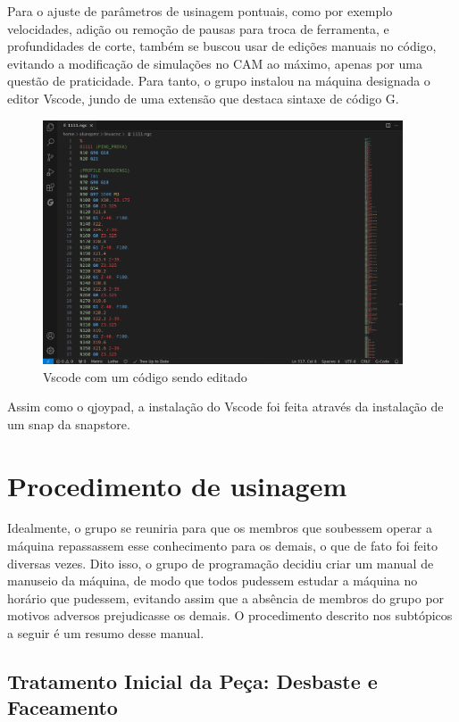 Para o ajuste de parâmetros de usinagem pontuais, como por exemplo velocidades, adição ou remoção de pausas para troca de ferramenta, e profundidades de corte, também se buscou usar de edições manuais no código, evitando a modificação de simulações no CAM ao máximo, apenas por uma questão de praticidade. Para tanto, o grupo instalou na máquina designada o editor Vscode, jundo de uma extensão que destaca sintaxe de código G.

\begin{figure}[H]
    \begin{center}
        \includegraphics[width=0.95\textwidth]{images/prog/codigo_g.png}
    \end{center}
    \caption{Vscode com um código sendo editado}\label{code}
\end{figure}

Assim como o qjoypad, a instalação do Vscode foi feita através da instalação de um snap da snapstore.

\section{Procedimento de usinagem}

Idealmente, o grupo se reuniria para que os membros que soubessem operar a máquina repassassem esse conhecimento para os demais, o que de fato foi feito diversas vezes. Dito isso, o grupo de programação decidiu criar um manual de manuseio da máquina, de modo que todos pudessem estudar a máquina no horário que pudessem, evitando assim que a absência de membros do grupo por motivos adversos prejudicasse os demais. O procedimento descrito nos subtópicos a seguir é um resumo desse manual.

\subsection{Tratamento Inicial da Peça: Desbaste e Faceamento}


